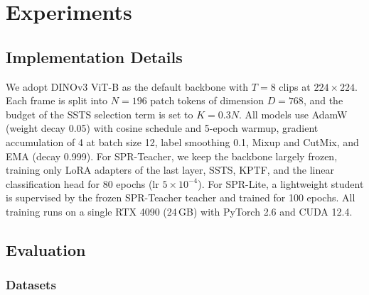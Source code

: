 \section{Experiments}

\subsection{Implementation Details}
\label{sec:exp:impl}
%
%
%

We adopt DINOv3 ViT-B as the default backbone with $T{=}8$ clips at $224{\times}224$.
Each frame is split into $N{=}196$ patch tokens of dimension $D{=}768$, and the
budget of the SSTS selection term is set to $K{=}0.3N$.
All models use AdamW (weight decay 0.05) with cosine schedule and 5-epoch warmup, 
gradient accumulation of 4 at batch size 12, label smoothing 0.1,
Mixup and CutMix, and EMA (decay 0.999).
For SPR-Teacher, we keep the backbone largely frozen, training only LoRA adapters of
the last layer, SSTS, KPTF, and the linear
classification head for 80 epochs (lr $5{\times}10^{-4}$).
For SPR-Lite, a lightweight student is supervised by the frozen SPR-Teacher
teacher and trained for 100 epochs.
All training runs on a single RTX 4090 (24\,GB) with PyTorch 2.6 and CUDA 12.4.









\subsection{Evaluation}
\subsubsection{Datasets}

